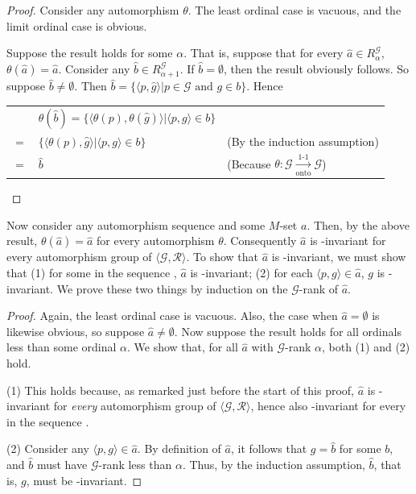\documentclass{article}
\theoremstyle{definition}
\begin{document}
\begin{proof}
Consider any automorphism $\theta$. The least ordinal case is vacuous, and the limit ordinal case is obvious.

Suppose the result holds for some $\alpha$. That is, suppose that for every $\hat{a}\in R^\mathcal{G}_\alpha$, 
$\theta(\hat{a})=\hat{a}$. Consider any $\hat{b}\in R^\mathcal{G}_{\alpha+1}$. If $\hat{b}=\emptyset$, then 
the result obviously follows. So suppose $\hat{b}\ne\emptyset$. Then 
$\hat{b}=\{\langle p,\hat{g}\rangle|p\in\mathcal{G}\textrm{ and }g\in b\}$. Hence 
\begin{center}
\begin{tabular}{lll}
& $\theta(\hat{b})=\{\langle\theta(p),\theta(\hat{g})\rangle|\langle p,g\rangle\in b\}$ \\
$=$ & $\{\langle\theta(p),\hat{g}\rangle|\langle p,g\rangle\in b\}$ & (By the induction assumption) \\
$=$ & $\hat{b}$ & (Because $\theta:\mathcal{G}\xrightarrow[\textrm{onto}]{\text{1-1}}\mathcal{G}$)
\end{tabular}
\end{center}

\end{proof}

Now consider any automorphism sequence  and some $M$-set $a$. Then, by the above result, 
$\theta(\hat{a})=\hat{a}$ for every automorphism $\theta$. Consequently 
$\hat{a}$ is -invariant for every automorphism group  of $\langle\mathcal{G},\mathcal{R}\rangle$. To show that 
$\hat{a}$ is -invariant, we must show that (1) for some  in the sequence 
, $\hat{a}$ is -invariant; (2) for each $\langle p,g\rangle\in\hat{a}$, $g$ is 
-invariant. We prove these two things by induction on the $\mathcal{G}$-rank of $\hat{a}$.

\begin{proof}
Again, the least ordinal case is vacuous. Also, the case when 
$\hat{a}=\emptyset$ is likewise obvious, so suppose $\hat{a}\ne\emptyset$. Now suppose the result holds for all ordinals less than some 
ordinal $\alpha$. We show that, for all $\hat{a}$ with $\mathcal{G}$-rank $\alpha$, both (1) and (2) hold.

(1) This holds because, as remarked just before the start of this proof, 
$\hat{a}$ is -invariant for \textit{every} automorphism group  of $\langle\mathcal{G},\mathcal{R}\rangle$,
hence also -invariant for every  in the sequence .

(2) Consider any $\langle p,g\rangle\in\hat{a}$. By definition of $\hat{a}$, it follows that 
$g=\hat{b}$ for some $b$, and $\hat{b}$ must have $\mathcal{G}$-rank less than $\alpha$. Thus, by the induction 
assumption, $\hat{b}$, that is, $g$, must be -invariant.

\end{proof}
\end{document}

